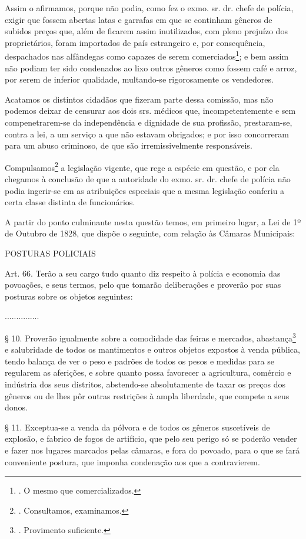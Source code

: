 Assim o afirmamos, porque não podia, como fez o exmo. sr. dr. chefe de
polícia, exigir que fossem abertas latas e garrafas em que se continham
gêneros de subidos preços que, além de ficarem assim inutilizados, com
pleno prejuízo dos proprietários, foram importados de país estrangeiro
e, por consequência, despachados nas alfândegas como capazes de serem
comerciados\footnote{. O mesmo que comercializados.}; e bem assim não
podiam ter sido condenados ao lixo outros gêneros como fossem café e
arroz, por serem de inferior qualidade, multando-se rigorosamente os
vendedores.

Acatamos os distintos cidadãos que fizeram parte dessa comissão, mas não
podemos deixar de censurar aos dois srs. médicos que, incompetentemente
e sem compenetrarem-se da independência e dignidade de sua profissão,
prestaram-se, contra a lei, a um serviço a que não estavam obrigados; e
por isso concorreram para um abuso criminoso, de que são
irremissivelmente responsáveis.

Compulsamos\footnote{. Consultamos, examinamos.} a legislação vigente,
que rege a espécie em questão, e por ela chegamos à conclusão de que a
autoridade do exmo. sr. dr. chefe de polícia não podia ingerir-se em as
atribuições especiais que a mesma legislação conferiu a certa classe
distinta de funcionários.

A partir do ponto culminante nesta questão temos, em primeiro lugar, a
Lei de 1º de Outubro de 1828, que dispõe o seguinte, com relação às
Câmaras Municipais:

POSTURAS POLICIAIS

Art. 66. Terão a seu cargo tudo quanto diz respeito à polícia e economia
das povoações, e seus termos, pelo que tomarão deliberações e proverão
por suas posturas sobre os objetos seguintes:

...............

§ 10. Proverão igualmente sobre a comodidade das feiras e mercados,
abastança\footnote{. Provimento suficiente.} e salubridade de todos os
mantimentos e outros objetos expostos à venda pública, tendo balança de
ver o peso e padrões de todos os pesos e medidas para se regularem as
aferições, e sobre quanto possa favorecer a agricultura, comércio e
indústria dos seus distritos, abstendo-se absolutamente de taxar os
preços dos gêneros ou de lhes pôr outras restrições à ampla liberdade,
que compete a seus donos.

§ 11. Exceptua-se a venda da pólvora e de todos os gêneros suscetíveis
de explosão, e fabrico de fogos de artifício, que pelo seu perigo só se
poderão vender e fazer nos lugares marcados pelas câmaras, e fora do
povoado, para o que se fará conveniente postura, que imponha condenação
aos que a contravierem.

